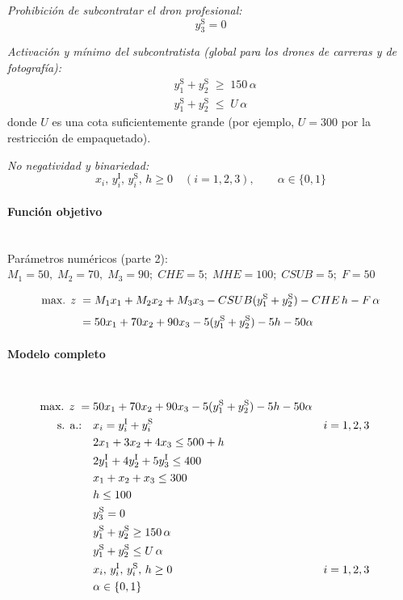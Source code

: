 \textit{Prohibición de subcontratar el dron profesional:}
\begin{equation}
y_3^{\mathrm{S}} = 0
\end{equation}

\textit{Activación y mínimo del subcontratista (global para los drones de carreras y de fotografía):}
\begin{align}
& y_1^{\mathrm{S}} + y_2^{\mathrm{S}} \;\geq\; 150\, \alpha \\
& y_1^{\mathrm{S}} + y_2^{\mathrm{S}} \;\leq\; U\, \alpha
\end{align}
donde $U$ es una cota suficientemente grande (por ejemplo, $U=300$ por la restricción de empaquetado).

\textit{No negatividad y binariedad:}
\begin{equation}
x_i,\, y_i^{\mathrm{I}},\, y_i^{\mathrm{S}},\, h \geq 0 \quad (i=1,2,3),
\qquad \alpha \in \{0,1\}
\end{equation}


\paragraph{Función objetivo}\mbox{}\\
Parámetros numéricos (parte 2):
\(
M_1=50,\; M_2=70,\; M_3=90;\;
CHE=5;\; MHE=100;\; CSUB=5;\; F=50
\)

\begin{align}
\mbox{max. } z \;=\;&
M_1x_1 + M_2x_2 + M_3x_3
- CSUB(y_1^{\mathrm{S}} + y_2^{\mathrm{S}})
- CHE\,h
- F\,\alpha \notag\\[1mm]
=\;&
50x_1 + 70x_2 + 90x_3
- 5(y_1^{\mathrm{S}} + y_2^{\mathrm{S}})
- 5h - 50\alpha
\end{align}


\paragraph{Modelo completo}\mbox{}\\[-1mm]
\begin{align}
\mbox{max. } z \;=\;&
50x_1 + 70x_2 + 90x_3
- 5(y_1^{\mathrm{S}} + y_2^{\mathrm{S}})
- 5h - 50\alpha \notag\\
\mbox{s. a.:}\quad
& x_i = y_i^{\mathrm{I}} + y_i^{\mathrm{S}} && i = 1,2,3 \notag\\
& 2x_1 + 3x_2 + 4x_3 \leq 500 + h \notag\\
& 2y_1^{\mathrm{I}} + 4y_2^{\mathrm{I}} + 5y_3^{\mathrm{I}} \leq 400 \notag\\
& x_1 + x_2 + x_3 \leq 300 \notag\\
& h \leq 100 \notag\\
& y_3^{\mathrm{S}} = 0 \notag\\
& y_1^{\mathrm{S}} + y_2^{\mathrm{S}} \geq 150\,\alpha \notag\\
& y_1^{\mathrm{S}} + y_2^{\mathrm{S}} \leq U\,\alpha \notag\\
& x_i,\, y_i^{\mathrm{I}},\, y_i^{\mathrm{S}},\, h \geq 0 && i=1,2,3 \notag\\
& \alpha \in \{0,1\} \notag
\end{align}


